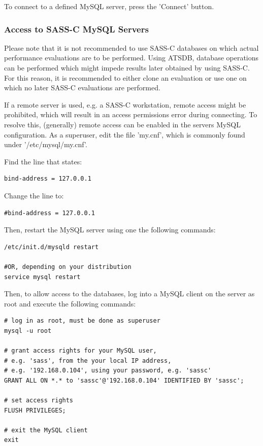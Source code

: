 To connect to a defined MySQL server, press the 'Connect' button.\\

\subsubsection{Access to SASS-C MySQL Servers}

Please note that it is not recommended to use SASS-C databases on which actual performance evaluations are to be performed. Using ATSDB, database operations can be performed which might impede results later obtained by using SASS-C. For this reason, it is recommended to either clone an evaluation or use one on which no later SASS-C evaluations are performed.

If a remote server is used, e.g. a SASS-C workstation, remote access might be prohibited, which will result in an access permissions error during connecting. To resolve this, (generally) remote access can be enabled in the servers MySQL configuration. As a superuser, edit the file 'my.cnf', which is commonly found under '/etc/mysql/my.cnf'. 

Find the line that states:
\begin{verbatim}
bind-address = 127.0.0.1
\end{verbatim}

Change the line to:

\begin{verbatim}
#bind-address = 127.0.0.1
\end{verbatim}

Then, restart the MySQL server using one the following commands:

\begin{verbatim}
/etc/init.d/mysqld restart

#OR, depending on your distribution
service mysql restart
\end{verbatim}

Then, to allow access to the databases, log into a MySQL client on the server as root and execute the following commands:

\begin{verbatim}
# log in as root, must be done as superuser
mysql -u root

# grant access rights for your MySQL user, 
# e.g. 'sass', from the your local IP address, 
# e.g. '192.168.0.104', using your password, e.g. 'sassc'
GRANT ALL ON *.* to 'sassc'@'192.168.0.104' IDENTIFIED BY 'sassc';

# set access rights
FLUSH PRIVILEGES;

# exit the MySQL client
exit
\end{verbatim}

